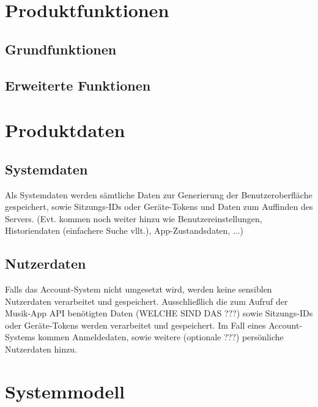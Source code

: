 \documentclass[oneside, ngerman]{sdqtechreport}
\begin{document}
\chapter{Produktfunktionen}
\label{chap:Produktfunktionen}

\section{Grundfunktionen}
\label{sec:Produktfunktionen:Software}

\section{Erweiterte Funktionen}
\label{sec:Produktfunktionen:Hardware}



\chapter{Produktdaten}
\label{chap:Produktdaten}

\section{Systemdaten}
\label{sec:Produktdaten:Systemdaten}

Als Systemdaten werden sämtliche Daten zur Generierung der Benutzeroberfläche gespeichert, sowie Sitzungs-IDs oder Geräte-Tokens und Daten zum Auffinden des Servers. (Evt. kommen noch weiter hinzu wie Benutzereinstellungen, Historiendaten (einfachere Suche vllt.),  App-Zustandsdaten, ...)

\section{Nutzerdaten}
\label{sec:Produktdaten:Nutzerdaten}

Falls das Account-System nicht umgesetzt wird, werden keine sensiblen Nutzerdaten verarbeitet und gespeichert. Ausschließlich die zum Aufruf der Musik-App API benötigten Daten (WELCHE SIND DAS ???) sowie Sitzungs-IDs oder Geräte-Tokens werden verarbeitet und gespeichert.
Im Fall eines Account-Systems kommen Anmeldedaten, sowie weitere (optionale ???) persönliche Nutzerdaten hinzu.



\chapter{Systemmodell}
\label{chap:Systemmodell}
\end{document}
